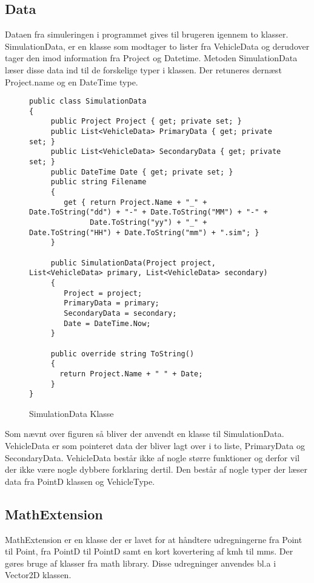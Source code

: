 \subsection{Data}
Dataen fra simuleringen i programmet gives til brugeren igennem to klasser. SimulationData, er en klasse som modtager to lister fra VehicleData og derudover tager den imod information fra Project og Datetime. Metoden SimulationData læser disse data ind til de forskelige typer i klassen. Der retuneres dernæst Project.name og en DateTime type.

\begin{figure}[H]
\begin{lstlisting}
public class SimulationData
{
     public Project Project { get; private set; }
     public List<VehicleData> PrimaryData { get; private set; }
     public List<VehicleData> SecondaryData { get; private set; }
     public DateTime Date { get; private set; }
     public string Filename
     {
        get { return Project.Name + "_" + Date.ToString("dd") + "-" + Date.ToString("MM") + "-" + 
              Date.ToString("yy") + "_" + Date.ToString("HH") + Date.ToString("mm") + ".sim"; }
     }
        
     public SimulationData(Project project, List<VehicleData> primary, List<VehicleData> secondary)
     {
        Project = project;
        PrimaryData = primary;
        SecondaryData = secondary;
        Date = DateTime.Now;
     }

     public override string ToString()
     {
       return Project.Name + " " + Date;
     }
}
\end{lstlisting}
\caption{SimulationData Klasse} \label{SimulatonDataClass}
\end{figure}
Som nævnt over figuren så bliver der anvendt en klasse til SimulationData. VehicleData er som pointeret data der bliver lagt over i to liste, PrimaryData og SecondaryData. VehicleData består ikke af nogle større funktioner og derfor vil der ikke være nogle dybbere forklaring dertil. Den består af nogle typer der læser data fra PointD klassen og VehicleType.
\subsection{MathExtension}
MathExtension er en klasse der er lavet for at håndtere udregningerne fra Point til Point, fra PointD til PointD samt en kort kovertering af kmh til mms. Der gøres bruge af klasser fra math library. Disse udregninger anvendes bl.a i Vector2D klassen.
